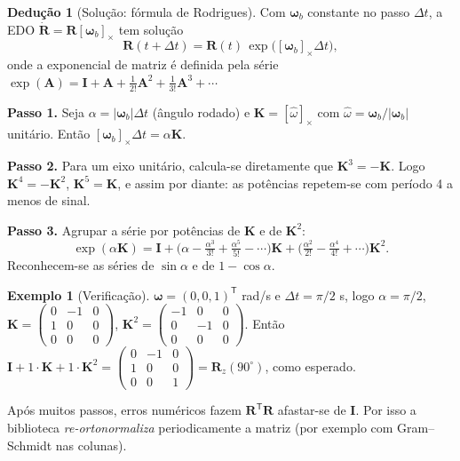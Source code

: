 \documentclass[11pt,a4paper]{article}
\newcommand{\vv}[1]{\mathbf{#1}}              %
\newcommand{\Rot}{\mathbf{R}}
\newcommand{\Id}{\mathbf{I}}
\newcommand{\T}{^{\mathsf{T}}}
\theoremstyle{definition}
\newtheorem{deducao}{Dedução}[section]
\newtheorem{exemplo}{Exemplo}[section]
\newcommand{\resultado}[1]{\begin{center}\fbox{\parbox{0.9\textwidth}{\centering #1}}\end{center}}
\begin{document}
\begin{deducao}[Solução: fórmula de Rodrigues]
Com $\vv{\omega}_b$ constante no passo $\Delta t$, a EDO $\dot{\Rot}=\Rot[\vv{\omega}_b]_\times$ tem solução
\[
\Rot(t+\Delta t)=\Rot(t)\,\exp\!\big([\vv{\omega}_b]_\times\Delta t\big),
\]
onde a exponencial de matriz é definida pela série $\exp(\mathbf{A})=\Id+\mathbf{A}+\tfrac{1}{2!}\mathbf{A}^2+\tfrac{1}{3!}\mathbf{A}^3+\cdots$

\textbf{Passo 1.} Seja $\alpha=|\vv{\omega}_b|\Delta t$ (ângulo rodado) e $\mathbf{K}=[\hat{\omega}]_\times$ com $\hat{\omega}=\vv{\omega}_b/|\vv{\omega}_b|$ unitário. Então $[\vv{\omega}_b]_\times\Delta t=\alpha\mathbf{K}$.

\textbf{Passo 2.} Para um eixo unitário, calcula-se diretamente que $\mathbf{K}^3=-\mathbf{K}$. Logo $\mathbf{K}^4=-\mathbf{K}^2$, $\mathbf{K}^5=\mathbf{K}$, e assim por diante: as potências repetem-se com período 4 a menos de sinal.

\textbf{Passo 3.} Agrupar a série por potências de $\mathbf{K}$ e de $\mathbf{K}^2$:
\[
\exp(\alpha\mathbf{K})=\Id+\Big(\alpha-\tfrac{\alpha^3}{3!}+\tfrac{\alpha^5}{5!}-\cdots\Big)\mathbf{K}
+\Big(\tfrac{\alpha^2}{2!}-\tfrac{\alpha^4}{4!}+\cdots\Big)\mathbf{K}^2 .
\]
Reconhecem-se as séries de $\sin\alpha$ e de $1-\cos\alpha$.
\end{deducao}

\resultado{$\exp(\alpha\mathbf{K})=\Id+\sin\alpha\,\mathbf{K}+(1-\cos\alpha)\,\mathbf{K}^2$}

\begin{exemplo}[Verificação]
$\vv{\omega}=(0,0,1)\T$ rad/s e $\Delta t=\pi/2$ s, logo $\alpha=\pi/2$, $\mathbf{K}=\begin{pmatrix}0&-1&0\\1&0&0\\0&0&0\end{pmatrix}$, $\mathbf{K}^2=\begin{pmatrix}-1&0&0\\0&-1&0\\0&0&0\end{pmatrix}$. Então $\Id+1\cdot\mathbf{K}+1\cdot\mathbf{K}^2=\begin{pmatrix}0&-1&0\\1&0&0\\0&0&1\end{pmatrix}=\Rot_z(90^\circ)$, como esperado.
\end{exemplo}

Após muitos passos, erros numéricos fazem $\Rot\T\Rot$ afastar-se de $\Id$. Por isso a biblioteca \emph{re-ortonormaliza} periodicamente a matriz (por exemplo com Gram--Schmidt nas colunas).
\end{document}
